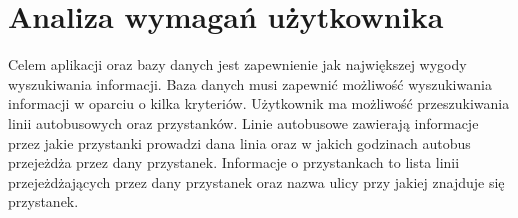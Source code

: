 \section{Analiza wymagań użytkownika}


Celem aplikacji oraz bazy danych jest zapewnienie jak największej wygody wyszukiwania informacji. Baza danych musi zapewnić możliwość wyszukiwania informacji w oparciu o kilka kryteriów. Użytkownik ma możliwość przeszukiwania linii autobusowych oraz przystanków. Linie autobusowe zawierają informacje przez jakie przystanki prowadzi dana linia oraz w jakich godzinach autobus przejeżdża przez dany przystanek. Informacje o przystankach to lista linii przejeżdżających przez dany przystanek oraz nazwa ulicy przy jakiej znajduje się przystanek.